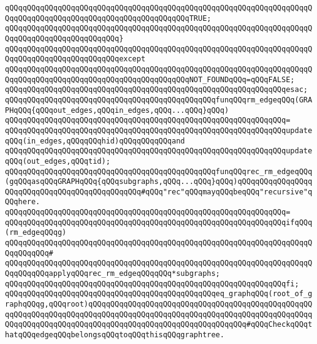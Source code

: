 \verb|qQQqqQQqqQQqqQQqqQQqqQQqqQQqqQQqqQQqqQQqqQQqqQQqqQQqqQQqqQQqqQQqqQQqqQQqqQQqqQQqqQQqqQQqqQQqqQQqqQQqqQQqqQQqqQQqTRUE;|\newline
\verb|qQQqqQQqqQQqqQQqqQQqqQQqqQQqqQQqqQQqqQQqqQQqqQQqqQQqqQQqqQQqqQQqqQQqqQQqqQQqqQQqqQQqqQQqqQQqqQQq}|\newline
\verb|qQQqqQQqqQQqqQQqqQQqqQQqqQQqqQQqqQQqqQQqqQQqqQQqqQQqqQQqqQQqqQQqqQQqqQQqqQQqqQQqqQQqqQQqqQQqqQQqexcept|\newline
\verb|qQQqqQQqqQQqqQQqqQQqqQQqqQQqqQQqqQQqqQQqqQQqqQQqqQQqqQQqqQQqqQQqqQQqqQQqqQQqqQQqqQQqqQQqqQQqqQQqqQQqqQQqqQQqqQQqNOT_FOUNDqQQq=qQQqFALSE;|\newline
\verb|qQQqqQQqqQQqqQQqqQQqqQQqqQQqqQQqqQQqqQQqqQQqqQQqqQQqqQQqqQQqqQQqesac;|\newline
\newline
\newline
\verb|qQQqqQQqqQQqqQQqqQQqqQQqqQQqqQQqqQQqqQQqqQQqqQQqfunqQQqrm_edgeqQQq(GRAPHqQQq{qQQqout_edges,qQQqin_edges,qQQq...qQQq}qQQq)|\newline
\verb|qQQqqQQqqQQqqQQqqQQqqQQqqQQqqQQqqQQqqQQqqQQqqQQqqQQqqQQqqQQqqQQq=|\newline
\verb|qQQqqQQqqQQqqQQqqQQqqQQqqQQqqQQqqQQqqQQqqQQqqQQqqQQqqQQqqQQqqQQqupdateqQQq(in_edges,qQQqqQQqhid)qQQqqQQqqQQqand|\newline
\verb|qQQqqQQqqQQqqQQqqQQqqQQqqQQqqQQqqQQqqQQqqQQqqQQqqQQqqQQqqQQqqQQqupdateqQQq(out_edges,qQQqtid);|\newline
\newline
\verb|qQQqqQQqqQQqqQQqqQQqqQQqqQQqqQQqqQQqqQQqqQQqqQQqfunqQQqrec_rm_edgeqQQq(gqQQqasqQQqGRAPHqQQq{qQQqsubgraphs,qQQq...qQQq}qQQq)qQQqqQQqqQQqqQQqqQQqqQQqqQQqqQQqqQQqqQQqqQQqqQQq#qQQq"rec"qQQqmayqQQqbeqQQq"recursive"qQQqhere.|\newline
\verb|qQQqqQQqqQQqqQQqqQQqqQQqqQQqqQQqqQQqqQQqqQQqqQQqqQQqqQQqqQQqqQQq=|\newline
\verb|qQQqqQQqqQQqqQQqqQQqqQQqqQQqqQQqqQQqqQQqqQQqqQQqqQQqqQQqqQQqqQQqifqQQq(rm_edgeqQQqg)|\newline
\verb|qQQqqQQqqQQqqQQqqQQqqQQqqQQqqQQqqQQqqQQqqQQqqQQqqQQqqQQqqQQqqQQqqQQqqQQqqQQqqQQq#|\newline
\verb|qQQqqQQqqQQqqQQqqQQqqQQqqQQqqQQqqQQqqQQqqQQqqQQqqQQqqQQqqQQqqQQqqQQqqQQqqQQqqQQqapplyqQQqrec_rm_edgeqQQqqQQq*subgraphs;|\newline
\verb|qQQqqQQqqQQqqQQqqQQqqQQqqQQqqQQqqQQqqQQqqQQqqQQqqQQqqQQqqQQqqQQqfi;|\newline
\newline
\verb|qQQqqQQqqQQqqQQqqQQqqQQqqQQqqQQqqQQqqQQqqQQqqQQqeq_graphqQQq(root_of_graphqQQqg,qQQqroot)qQQqqQQqqQQqqQQqqQQqqQQqqQQqqQQqqQQqqQQqqQQqqQQqqQQqqQQqqQQqqQQqqQQqqQQqqQQqqQQqqQQqqQQqqQQqqQQqqQQqqQQqqQQqqQQqqQQqqQQqqQQqqQQqqQQqqQQqqQQqqQQqqQQqqQQqqQQqqQQqqQQqqQQqqQQqqQQq#qQQqCheckqQQqthatqQQqedgeqQQqbelongsqQQqtoqQQqthisqQQqgraphtree.|\newline
